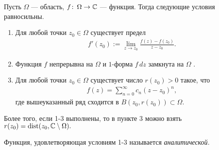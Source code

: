 \documentclass[../../main.tex]{subfiles}
\begin{document}
\begin{thm}
\label{theorem:cauchy-gursa-morer}
 Пусть $\Omega$  --- область, $f\colon\,\Omega \to \mathbb{C}$  --- функция. Тогда следующие условия равносильны.
 \begin{enumerate}
  \item \label{enum1:theorem:cauchy_gurs_morer} Для любой точки $z_0 \in \Omega$ существует предел
   \begin{align*}
    f'(z_0) := \lim_{z \to z_0} \frac{f(z) - f(z_0)}{z-z_0}.
   \end{align*} 
  \item Функция $f$ непрерывна на $\Omega$ и $1$-форма $f\,dz$  замкнута на $\Omega$ .
  \item Для любой точки $ z_0 \in \Omega$ существует число $r(z_0) > 0$ такое, что
    \begin{align*}
    f(z) = \sum_{n=0}^{\infty} c_n(z-z_0)^{n},
   \end{align*} где вышеуказанный ряд сходится в $B(z_0, r(z_0)) \subset \Omega$.
 \end{enumerate}
 Более того,  если 1-3 выполнены, то в пункте 3 можно взять $r(z_0) = \mathrm{dist}(z_0, \mathbb{C} \setminus \Omega).$
\end{thm}
\begin{df}
 Функция, удовлетворяющая условиям 1-3 называется \textit{аналитической}.
\end{df}
\end{document}
